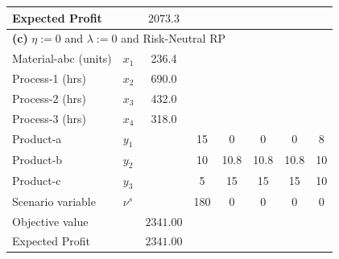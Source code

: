 \documentclass[7pt]{article}
\begin{document}
\begin{table}[h!]
\begin{tabular}{ll|c|ccccc}
        Expected Profit       &                                            & $2073.3$        &                                                                                     \\
        \midrule
        \multicolumn{8}{l}{\textbf{(c)} $\eta := 0$ and $\lambda:=0$ and Risk-Neutral RP}                                                                                          \\
        \midrule
        Material-abc (units)  & $x_1$                                      & 236.4           &              &                   &               &                  &               \\
        Process-1 (hrs)       & $x_2$                                      & 690.0           &              &                   &               &                  &               \\
        Process-2 (hrs)       & $x_3$                                      & 432.0           &              &                   &               &                  &               \\
        Process-3 (hrs)       & $x_4$                                      & 318.0           &              &                   &               &                  &               \\
        Product-a             & $y_1$                                      &                 & 15           & 0                 & 0             & 0                & 8             \\
        Product-b             & $y_2$                                      &                 & 10           & 10.8              & 10.8          & 10.8             & 10            \\
        Product-c             & $y_3$                                      &                 & 5            & 15                & 15            & 15               & 10            \\
        Scenario variable     & $\nu^s$                                    &                 & 180          & 0                 & 0             & 0                & 0             \\
        Objective value       &                                            & $2341.00$       &                                                                                     \\
        Expected Profit       &                                            & $2341.00$       &                                                                                     \\
        \bottomrule
    \end{tabular}
\end{table}
\end{document}
